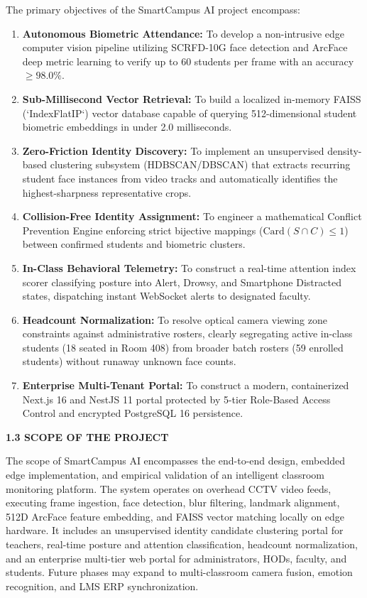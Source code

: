 \noindent The primary objectives of the SmartCampus AI project encompass:
\begin{enumerate}
    \item \textbf{Autonomous Biometric Attendance:} To develop a non-intrusive edge computer vision pipeline utilizing SCRFD-10G face detection and ArcFace deep metric learning to verify up to 60 students per frame with an accuracy $\ge 98.0\%$.
    \item \textbf{Sub-Millisecond Vector Retrieval:} To build a localized in-memory FAISS (`IndexFlatIP`) vector database capable of querying 512-dimensional student biometric embeddings in under 2.0 milliseconds.
    \item \textbf{Zero-Friction Identity Discovery:} To implement an unsupervised density-based clustering subsystem (HDBSCAN/DBSCAN) that extracts recurring student face instances from video tracks and automatically identifies the highest-sharpness representative crops.
    \item \textbf{Collision-Free Identity Assignment:} To engineer a mathematical Conflict Prevention Engine enforcing strict bijective mappings ($\text{Card}(S \cap C) \le 1$) between confirmed students and biometric clusters.
    \item \textbf{In-Class Behavioral Telemetry:} To construct a real-time attention index scorer classifying posture into Alert, Drowsy, and Smartphone Distracted states, dispatching instant WebSocket alerts to designated faculty.
    \item \textbf{Headcount Normalization:} To resolve optical camera viewing zone constraints against administrative rosters, clearly segregating active in-class students (18 seated in Room 408) from broader batch rosters (59 enrolled students) without runaway unknown face counts.
    \item \textbf{Enterprise Multi-Tenant Portal:} To construct a modern, containerized Next.js 16 and NestJS 11 portal protected by 5-tier Role-Based Access Control and encrypted PostgreSQL 16 persistence.
\end{enumerate}

\vspace{0.2in}
\begin{flushleft}
{\fontsize{14pt}{18pt}\selectfont \textbf{1.3 SCOPE OF THE PROJECT}}\\[2mm]
\end{flushleft}

\noindent The scope of SmartCampus AI encompasses the end-to-end design, embedded edge implementation, and empirical validation of an intelligent classroom monitoring platform. The system operates on overhead CCTV video feeds, executing frame ingestion, face detection, blur filtering, landmark alignment, 512D ArcFace feature embedding, and FAISS vector matching locally on edge hardware. It includes an unsupervised identity candidate clustering portal for teachers, real-time posture and attention classification, headcount normalization, and an enterprise multi-tier web portal for administrators, HODs, faculty, and students. Future phases may expand to multi-classroom camera fusion, emotion recognition, and LMS ERP synchronization.

